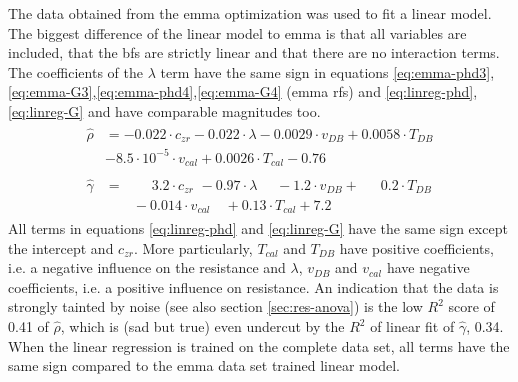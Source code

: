 The data obtained from the \gls{emma} optimization was used to fit a linear model. 
The biggest difference of the linear model to \gls{emma} is that all variables are included, that the \gls{bf}s are strictly linear and that there are no interaction terms. 
The coefficients of the $\lambda$ term have the same sign in equations \ref{eq:emma-phd3},\ref{eq:emma-G3},\ref{eq:emma-phd4},\ref{eq:emma-G4} (\gls{emma} \gls{rf}s) and \ref{eq:linreg-phd},\ref{eq:linreg-G} and have comparable magnitudes too. 
%
%
\begin{align}
	\begin{split}
		\label{eq:linreg-phd}
		\hat{\rho} &=  -0.022\cdot c_{zr} -0.022\cdot \lambda -0.0029\cdot v_{DB} + 0.0058\cdot T_{DB} \\
		& -8.5\cdot 10^{-5}\cdot v_{cal} + 0.0026\cdot T_{cal} -0.76
	\end{split}
	\\
	\begin{split}
		\label{eq:linreg-G}
		\hat{\gamma} &={}  \qquad 3.2\cdot c_{zr} \,\, - 0.97\cdot \lambda \,\,\quad - 1.2\cdot v_{DB} + \,\,\,\quad 0.2\cdot T_{DB} \\
			& \qquad - 0.014\cdot v_{cal} \quad + 0.13\cdot T_{cal} + 7.2
	\end{split}
\end{align}
%
All terms in equations \ref{eq:linreg-phd} and \ref{eq:linreg-G} have the same sign except the intercept and $c_{zr}$. 
%
More particularly, $T_{cal}$ and $T_{DB}$ have positive coefficients, i.e. a negative influence on the resistance 
and $\lambda$, $v_{DB}$ and $v_{cal}$ have negative coefficients, i.e. a positive influence on resistance. 
An indication that the data is strongly tainted by noise (see also section \ref{sec:res-anova}) is the low $R^2$ score of 0.41 of $\hat\rho$, 
which is (sad but true) even undercut by the $R^2$ of linear fit of $\hat\gamma$, 0.34. 
When the linear regression is trained on the complete data set, all terms have the same sign compared to the \gls{emma} data set trained linear model. 
